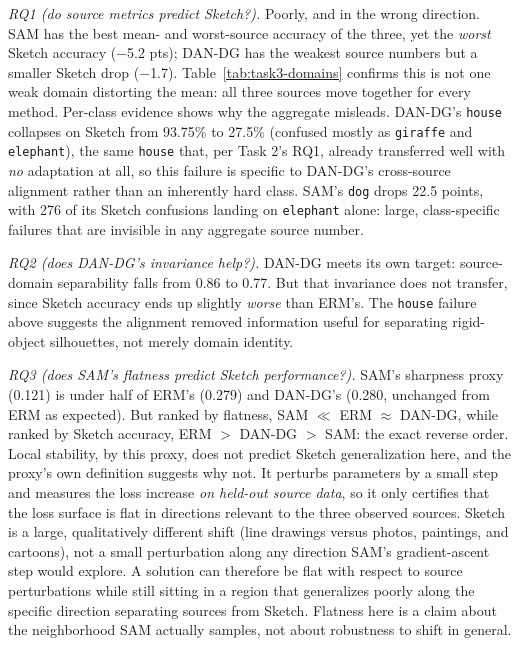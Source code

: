 \documentclass{article}
\begin{document}
\emph{RQ1 (do source metrics predict Sketch?).} Poorly, and in the wrong direction. SAM has the
best mean- and worst-source accuracy of the three, yet the \emph{worst} Sketch accuracy ($-$5.2
pts); DAN-DG has the weakest source numbers but a smaller Sketch drop ($-$1.7).
Table~\ref{tab:task3-domains} confirms this is not one weak domain distorting the mean: all three
sources move together for every method. Per-class evidence shows why the aggregate misleads.
DAN-DG's \texttt{house} collapses on Sketch from 93.75\% to 27.5\% (confused mostly as
\texttt{giraffe} and \texttt{elephant}), the same \texttt{house} that, per Task 2's RQ1, already
transferred well with \emph{no} adaptation at all, so this failure is specific to DAN-DG's
cross-source alignment rather than an inherently hard class. SAM's \texttt{dog} drops 22.5 points,
with 276 of its Sketch confusions landing on \texttt{elephant} alone: large, class-specific
failures that are invisible in any aggregate source number.

\emph{RQ2 (does DAN-DG's invariance help?).} DAN-DG meets its own target: source-domain
separability falls from 0.86 to 0.77. But that invariance does not transfer, since Sketch accuracy
ends up slightly \emph{worse} than ERM's. The \texttt{house} failure above suggests the alignment
removed information useful for separating rigid-object silhouettes, not merely domain identity.

\emph{RQ3 (does SAM's flatness predict Sketch performance?).} SAM's sharpness proxy (0.121) is
under half of ERM's (0.279) and DAN-DG's (0.280, unchanged from ERM as expected). But ranked by
flatness, SAM $\ll$ ERM $\approx$ DAN-DG, while ranked by Sketch accuracy, ERM $>$ DAN-DG $>$ SAM:
the exact reverse order. Local stability, by this proxy, does not predict Sketch generalization
here, and the proxy's own definition suggests why not. It perturbs parameters by a small step and
measures the loss increase \emph{on held-out source data}, so it only certifies that the loss
surface is flat in directions relevant to the three observed sources. Sketch is a large,
qualitatively different shift (line drawings versus photos, paintings, and cartoons), not a small
perturbation along any direction SAM's gradient-ascent step would explore. A solution can therefore
be flat with respect to source perturbations while still sitting in a region that generalizes
poorly along the specific direction separating sources from Sketch. Flatness here is a claim about
the neighborhood SAM actually samples, not about robustness to shift in general.
\end{document}
